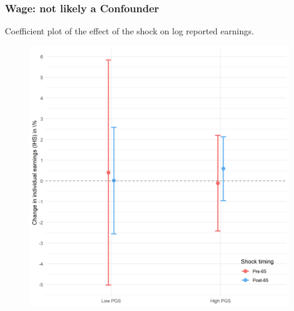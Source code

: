 \documentclass[10pt,compress,xcolor=dvipsnames,aspectratio=169]{beamer}    %
\newcounter{ex}
\newcommand{\1}[1]{\mathrm{1\hspace*{-2.5pt}l}[#1]}	%
\begin{document}
\begin{frame}
\frametitle{Wage: not likely a Confounder}
Coefficient plot of the effect of the shock on log reported earnings.
\begin{figure}[hbtp]
\centering
\includegraphics[height=0.8\textheight]{../../3_output/shock_effects/IHSwage_6070_100_cvplot.png}
\label{fig:wage}
\end{figure}
\end{frame}
\end{document}
